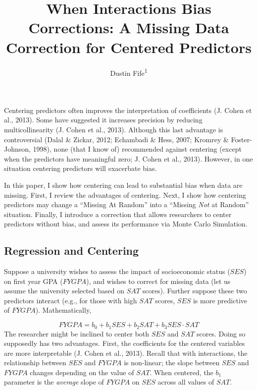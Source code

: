 \documentclass[english,man]{apa6}
\title{When Interactions Bias Corrections: A Missing Data Correction for
Centered Predictors}
\author{Dustin Fife\textsuperscript{1}}
\affiliation{
    \vspace{0.5cm}
          \textsuperscript{1} Rowan University  }
\theoremstyle{definition}
\theoremstyle{definition}
\theoremstyle{remark}
\begin{document}
\maketitle

\setcounter{secnumdepth}{0}



Centering predictors often improves the interpretation of coefficients
(J. Cohen et al., 2013). Some have suggested it increases precision by
reducing multicollinearity (J. Cohen et al., 2013). Although this last
advantage is controversial (Dalal \& Zickar, 2012; Echambadi \& Hess,
2007; Kromrey \& Foster-Johnson, 1998), none (that I know of)
recommended against centering (except when the predictors have
meaningful zero; J. Cohen et al., 2013). However, in one situation
centering predictors will exacerbate bias.

In this paper, I show how centering can lead to substantial bias when
data are missing. First, I review the advantages of centering. Next, I
show how centering predictors may change a \enquote{Missing At Random}
into a \enquote{Missing \emph{Not} at Random} situation. Finally, I
introduce a correction that allows researchers to center predictors
without bias, and assess its performance via Monte Carlo Simulation.

\subsection{Regression and Centering}\label{regression-and-centering}

Suppose a university wishes to assess the impact of socioeconomic status
(\(SES\)) on first year GPA (\(FYGPA\)), and wishes to correct for
missing data (let us assume the university selected based on \(SAT\)
scores). Further suppose these two predictors interact (e.g., for those
with high \(SAT\) scores, \(SES\) is more predictive of \(FYGPA\)).
Mathematically,

\[ FYGPA = b_0 + b_1SES + b_2SAT + b_3SES\cdot SAT \] The researcher
might be inclined to center both \(SES\) and \(SAT\) scores. Doing so
supposedly has two advantages. First, the coefficients for the centered
variables are more interpretable (J. Cohen et al., 2013). Recall that
with interactions, the relationship between \(SES\) and \(FYGPA\) is
non-linear; the slope between \(SES\) and \(FYGPA\) changes depending on
the value of \(SAT\). When centered, the \(b_1\) parameter is the
\emph{average} slope of \(FYGPA\) on \(SES\) across all values of
\(SAT\).
\end{document}
